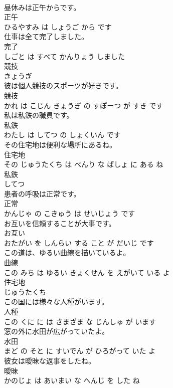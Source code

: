 \documentclass[8pt]{extreport}
\begin{document}
\begin{CJK}{UTF8}{min}
\\	昼休みは正午からです。	
\\	正午 
\\	ひるやすみ は しょうご から です			
\\	仕事は全て完了しました。	
\\	完了 
\\	しごと は すべて かんりょう しました			
\\	競技	
\\	きょうぎ			
\\	彼は個人競技のスポーツが好きです。	
\\	競技 
\\	かれ は こじん きょうぎ の すぽーつ が すき です			
\\	私は私鉄の職員です。	
\\	私鉄 
\\	わたし は してつ の しょくいん です			
\\	その住宅地は便利な場所にあるね。	
\\	住宅地 
\\	その じゅうたくち は べんり な ばしょ に ある ね			
\\	私鉄	
\\	してつ			
\\	患者の呼吸は正常です。	
\\	正常 
\\	かんじゃ の こきゅう は せいじょう です			
\\	お互いを信頼することが大事です。	
\\	お互い 
\\	おたがい を しんらい する こと が だいじ です			
\\	この道は、ゆるい曲線を描いているよ。	
\\	曲線 
\\	この みち は ゆるい きょくせん を えがいて いる よ			
\\	住宅地	
\\	じゅうたくち			
\\	この国には様々な人種がいます。	
\\	人種 
\\	この くに に は さまざま な じんしゅ が います			
\\	窓の外に水田が広がっていたよ。	
\\	水田 
\\	まど の そと に すいでん が ひろがって いた よ			
\\	彼女は曖昧な返事をしたね。	
\\	曖昧 
\\	かのじょ は あいまい な へんじ を した ね			

\end{CJK}
\end{document}
